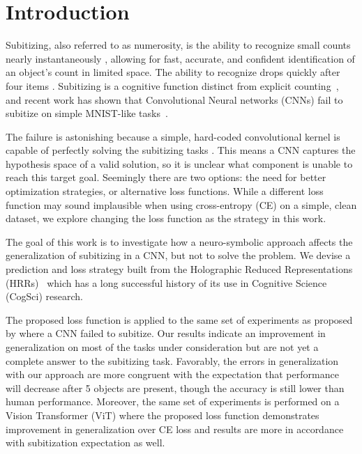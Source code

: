 \documentclass[letterpaper]{article} %
\begin{document}
\section{Introduction}
Subitizing, also referred to as numerosity, is the ability to recognize small counts nearly instantaneously \cite{Kaufman1949}, allowing for fast, accurate, and confident identification of an object's count in limited space. The ability to recognize drops quickly after four items \cite{Saltzman1948}. Subitizing is a cognitive function distinct from explicit counting~\cite{Trick1994}, and recent work has shown that Convolutional Neural networks (CNNs) fail to subitize on simple MNIST-like tasks~\cite{b1}.
\par 
The failure is astonishing because a simple, hard-coded convolutional kernel is capable of perfectly solving the subitizing tasks \cite{b1}. This means a CNN captures the hypothesis space of a valid solution, so it is unclear what component is unable to reach this target goal. Seemingly there are two options: the need for better optimization strategies, or alternative loss functions. While a different loss function may sound implausible when using cross-entropy (CE) on a simple, clean dataset, we explore changing the loss function as the strategy in this work.
\par 
The goal of this work is to investigate how a neuro-symbolic approach affects the generalization of subitizing in a CNN, but not to solve the problem. We devise a prediction and loss strategy built from the Holographic Reduced Representations (HRRs)~\cite{b2} which has a long successful history of its use in Cognitive Science (CogSci) research. 
\par 
The proposed loss function is applied to the same set of experiments as proposed by \cite{b1} where a CNN failed to subitize.  Our results indicate an improvement in generalization on most of the tasks under consideration but are not yet a complete answer to the subitizing task. Favorably, the errors in generalization with our approach are more congruent with the expectation that performance will decrease after 5 objects are present, though the accuracy is still lower than human performance. Moreover, the same set of experiments is performed on a Vision Transformer (ViT) \cite{vit} where the proposed loss function demonstrates improvement in generalization over CE loss and results are more in accordance with subitization expectation as well. 
\end{document}
